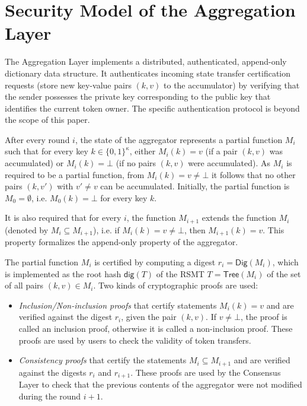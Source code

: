 \documentclass[11pt]{article}
\begin{document}
\section{Security Model of the Aggregation Layer}

The Aggregation Layer implements a distributed, authenticated, append-only dictionary data structure. It authenticates incoming state transfer certification requests (store new key-value pairs $(k,v)$ to the accumulator) by verifying that the sender possesses the private key corresponding to the public key that identifies the current token owner. The specific authentication protocol is beyond the scope of this paper.

After every round $i$, the state of the aggregator represents a partial function $M_i$ such that for every key $k\in\{0,1\}^\kappa$,
either $M_i(k)=v$ (if a pair $(k,v)$ was accumulated) or $M_i(k)=\bot$ (if no pairs $(k,v)$ were accumulated). As $M_i$ is required to be a partial function, from $M_i(k)=v\neq\bot$ it follows that no other pairs $(k,v')$ with $v'\neq v$ can be accumulated. Initially, the partial function is $M_0=\emptyset$, i.e. $M_0(k)=\bot$ for every key $k$.

It is also required that for every $i$, the function $M_{i+1}$ extends the function $M_i$ (denoted by $M_i\subseteq M_{i+1}$), i.e. if $M_i(k)=v\neq\bot$, then $M_{i+1}(k)=v$. This property formalizes the append-only property of the aggregator.

The partial function $M_i$ is certified by computing a digest $r_i=\mathsf{Dig}(M_i)$, which is implemented as the root hash $\mathsf{dig}(T)$ of the RSMT $T=\mathsf{Tree}(M_i)$ of the set of all pairs $(k,v)\in M_i$. Two kinds of cryptographic proofs are used:
\begin{itemize}
\item \emph{Inclusion/Non-inclusion proofs} that certify statements $M_i(k)=v$ and are verified against the digest $r_i$, given the pair $(k,v)$. If $v\neq\bot$, the proof is called an inclusion proof, otherwise it is called a non-inclusion proof. These proofs are used by users to check the validity of token transfers.
\item \emph{Consistency proofs} that certify the statements $M_i\subseteq M_{i+1}$ and are verified against the digests $r_i$ and $r_{i+1}$. These proofs are used by the Consensus Layer to check that the previous contents of the aggregator were not modified during the round $i+1$.
\end{itemize}
\end{document}
